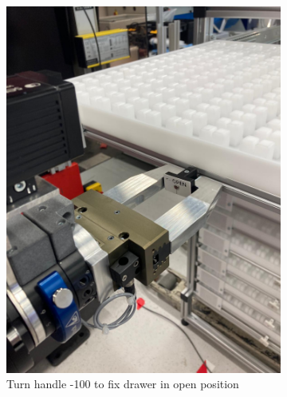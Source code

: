 \begin{figure}[h]
\begin{subfigure}[b]{0.32\textwidth}
        \includegraphics[width=\textwidth]{figures/shelf-control/close-handle.jpeg}
        \caption{Turn handle -100\textdegree{} to fix drawer in open position}
        \label{fig:close-handle}
    \end{subfigure}\hspace{0.1cm}
    \begin{subfigure}[b]{0.32\textwidth}
        \centering

\end{subfigure}
\end{figure}
